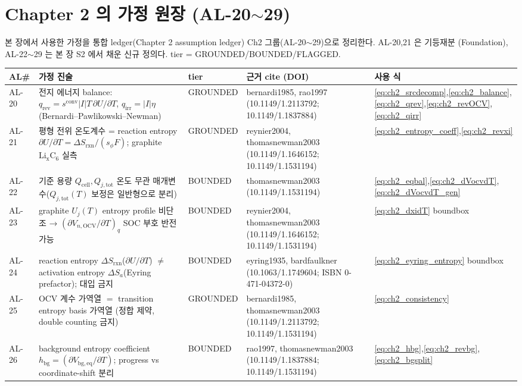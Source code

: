 \documentclass[11pt,a4paper]{article}
\newcommand{\eq}{\mathrm{eq}}
\newcommand{\bg}{\mathrm{bg}}
\newcommand{\cell}{\mathrm{cell}}
\newcommand{\OCV}{\mathrm{OCV}}
\newcommand{\tot}{\mathrm{tot}}
\newcommand{\irr}{\mathrm{irr}}
\newcommand{\rev}{\mathrm{rev}}
\newcommand{\rxn}{\mathrm{rxn}}
\newcommand{\conv}{\mathrm{conv}}
\begin{document}
\section{Chapter 2 의 가정 원장 (AL-20$\sim$29)}\label{sec:ch2_al}
본 장에서 사용한 가정을 통합 ledger(Chapter 2 assumption ledger) Ch2 그룹(AL-20$\sim$29)으로 정리한다. AL-20,21 은 기등재분
(Foundation), AL-22$\sim$29 는 본 장 S2 에서 채운 신규 정의다. tier = GROUNDED/BOUNDED/FLAGGED.
{\small
\begin{longtable}{p{} p{} p{} p{} p{}}
\toprule AL\# & 가정 진술 & tier & 근거 cite (DOI) & 사용 식 \\ \midrule \endhead
AL-20 & 전지 에너지 balance: $q_\rev=s^\conv|I|T\,\partial U/\partial T$, $q_\irr=|I|\eta$ (Bernardi--Pawlikowski--Newman) & GROUNDED & bernardi1985, rao1997 (10.1149/1.2113792; 10.1149/1.1837884) & \eqref{eq:ch2_srcdecomp},\eqref{eq:ch2_balance},\eqref{eq:ch2_qrev},\eqref{eq:ch2_revOCV},\eqref{eq:ch2_qirr} \\
AL-21 & 평형 전위 온도계수 = reaction entropy $\partial U/\partial T=\Delta S_\rxn/(s_\phi F)$; graphite $\mathrm{Li_xC_6}$ 실측 & GROUNDED & reynier2004, thomasnewman2003 (10.1149/1.1646152; 10.1149/1.1531194) & \eqref{eq:ch2_entropy_coeff},\eqref{eq:ch2_revxi} \\
AL-22 & 기준 용량 $Q_\cell,Q_{j,\tot}$ 온도 무관 매개변수($Q_{j,\tot}(T)$ 보정은 일반형으로 분리) & BOUNDED & thomasnewman2003 (10.1149/1.1531194) & \eqref{eq:ch2_eqbal},\eqref{eq:ch2_dVocvdT},\eqref{eq:ch2_dVocvdT_gen} \\
AL-23 & graphite $U_j(T)$ entropy profile 비단조 → $(\partial V_{n,\OCV}/\partial T)_q$ SOC 부호 반전 가능 & BOUNDED & reynier2004, thomasnewman2003 (10.1149/1.1646152; 10.1149/1.1531194) & \eqref{eq:ch2_dxidT} boundbox \\
AL-24 & reaction entropy $\Delta S_\rxn$($\partial U/\partial T$) $\ne$ activation entropy $\Delta S_a$(Eyring prefactor); 대입 금지 & BOUNDED & eyring1935, bardfaulkner (10.1063/1.1749604; ISBN 0-471-04372-0) & \eqref{eq:ch2_eyring_entropy} boundbox \\
AL-25 & OCV 계수 가역열 $=$ transition entropy basis 가역열 (정합 제약, double counting 금지) & GROUNDED & bernardi1985, thomasnewman2003 (10.1149/1.2113792; 10.1149/1.1531194) & \eqref{eq:ch2_consistency} \\
AL-26 & background entropy coefficient $h_\bg=(\partial V_{\bg,\eq}/\partial T)$; progress vs coordinate-shift 분리 & BOUNDED & rao1997, thomasnewman2003 (10.1149/1.1837884; 10.1149/1.1531194) & \eqref{eq:ch2_hbg},\eqref{eq:ch2_revbg},\eqref{eq:ch2_bgsplit} \\

\end{longtable}}
\end{document}
